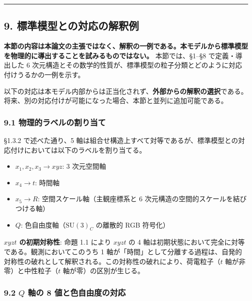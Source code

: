 \documentclass[
  a4paper,11pt]{ltjsarticle}
\providecommand{\tightlist}{%
  \setlength{\itemsep}{0pt}\setlength{\parskip}{0pt}}
\theoremstyle{definition}
\theoremstyle{remark}
\begin{document}
\begin{center}\rule{0.5\linewidth}{0.5pt}\end{center}

\subsection{9.
標準模型との対応の解釈例}\label{ux6a19ux6e96ux6a21ux578bux3068ux306eux5bfeux5fdcux306eux89e3ux91c8ux4f8b}

\textbf{本節の内容は本論文の主張ではなく、解釈の一例である。本モデルから標準模型を物理的に導出することを試みるものではない。}
本節では、§1--§8 で定義・導出した 6
次元構造とその数学的性質が、標準模型の粒子分類とどのように対応付けうるかの一例を示す。

以下の対応は本モデル内部からは正当化されず、\textbf{外部からの解釈の選択}である。将来、別の対応付けが可能になった場合、本節と並列に追加可能である。

\subsubsection{9.1
物理的ラベルの割り当て}\label{ux7269ux7406ux7684ux30e9ux30d9ux30ebux306eux5272ux308aux5f53ux3066}

§1.3.2 で述べた通り、5
軸は組合せ構造上すべて対等であるが、標準模型との対応付けにおいては以下のラベルを割り当てる。

\begin{itemize}
\tightlist
\item
  \(x_1, x_2, x_3 \to xyz\): 3 次元空間軸
\item
  \(x_4 \to t\): 時間軸
\item
  \(x_5 \to R\): 空間スケール軸（主観座標系と 6
  次元構造の空間的スケールを結びつける軸）
\item
  \(Q\): 色自由度軸（\(\mathrm{SU}(3)_C\) の離散的 RGB 符号化）
\end{itemize}

\textbf{\(xyzt\) の初期対称性}: 命題 1.1 により \(xyzt\) の 4
軸は初期状態において完全に対等である。観測においてこのうち 1
軸が「時間」として分離する過程は、自発的対称性の破れとして解釈される。この対称性の破れにより、荷電粒子（\(t\)
軸が非零）と中性粒子（\(t\) 軸が零）の区別が生じる。

\subsubsection{\texorpdfstring{9.2 \(Q\) 軸の 8
値と色自由度の対応}{9.2 Q 軸の 8 値と色自由度の対応}}\label{q-ux8ef8ux306e-8-ux5024ux3068ux8272ux81eaux7531ux5ea6ux306eux5bfeux5fdc}
\end{document}
